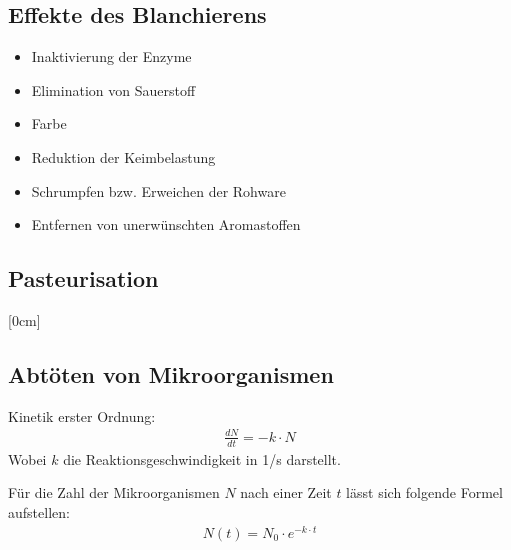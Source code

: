 \documentclass[a4paper,10pt,twoside]{article}
\begin{document}
\subsection{Effekte des Blanchierens}
\begin{itemize}
\item Inaktivierung der Enzyme
\item Elimination von Sauerstoff
\item Farbe
\item Reduktion der Keimbelastung
\item Schrumpfen bzw. Erweichen der Rohware
\item Entfernen von unerwünschten Aromastoffen
\end{itemize}
\pp

\subsection{Pasteurisation}
[0cm]


\subsection{Abtöten von Mikroorganismen}



Kinetik erster Ordnung:
\begin{align*}
\frac{dN}{dt} = - k \cdot N
\end{align*}
Wobei $k$ die Reaktionsgeschwindigkeit in 1/s darstellt. \par 
Für die Zahl der Mikroorganismen $N$ nach einer Zeit $t$ lässt sich folgende Formel aufstellen:
\begin{align*}
N(t) = N_0 \cdot e^{-k \cdot t}
\end{align*}
\end{document}
